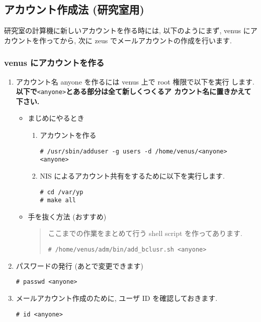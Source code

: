 \documentclass{jarticle}
\begin{document}
\subsection{アカウント作成法 (研究室用)}
研究室の計算機に新しいアカウントを作る時には, 以下のようにまず, venus
にアカウントを作ってから, 次に zeus でメールアカウントの作成を行います.
\subsubsection{venus にアカウントを作る}
\begin{enumerate}
\item アカウント名 anyone を作るには  venus 上で root 権限で以下を実行
  します.
  \textbf{以下で}\verb|<anyone>|\textbf{とある部分は全て新しくつくるア
    カウント名に置きかえて下さい. }
  \begin{itemize}
  \item まじめにやるとき
    \begin{enumerate}
    \item アカウントを作る
\begin{verbatim}
# /usr/sbin/adduser -g users -d /home/venus/<anyone> <anyone>
\end{verbatim}
    \item NIS によるアカウント共有をするために以下を実行します.
\begin{verbatim}
# cd /var/yp
# make all
\end{verbatim}
    \end{enumerate}

  \item 手を抜く方法 (おすすめ)
    \begin{quote}
      ここまでの作業をまとめて行う shell script を作ってあります.
\begin{verbatim}
# /home/venus/adm/bin/add_bclusr.sh <anyone>
\end{verbatim}
    \end{quote}
  \end{itemize}
\item パスワードの発行 (あとで変更できます)
\begin{verbatim}
# passwd <anyone>
\end{verbatim}
\item メールアカウント作成のために, ユーザ ID を確認しておきます.
\begin{verbatim}
# id <anyone>
\end{verbatim}
\end{enumerate}
\end{document}
